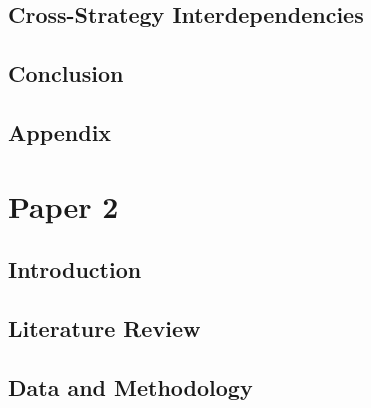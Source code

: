 \documentclass[12pt, oneside, letterpaper]{report}
\begin{document}
\section{Cross-Strategy Interdependencies}
\label{sec:interdependencies}


\section{Conclusion}
\label{sec:conclusion}


\clearpage
\begin{singlespace}

\end{singlespace}

\clearpage
\appendix
\section{Appendix}
\label{sec:appendix}


\clearpage


\clearpage



\clearpage
\chapter*{Paper 2}
\setcounter{section}{0}



\section{Introduction}
\label{sec:p2_introduction}


\section{Literature Review}
\label{sec:p2_literature}


\section{Data and Methodology}
\label{sec:p2_data}

\end{document}
